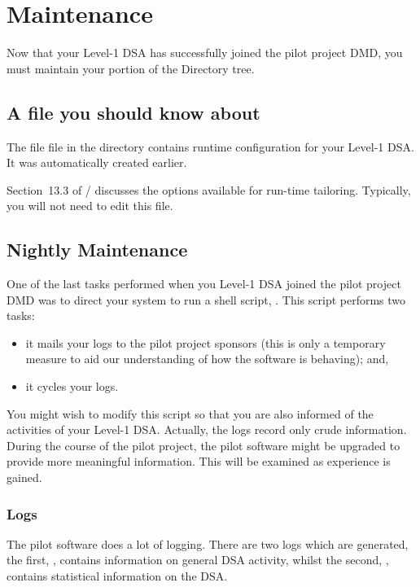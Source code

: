 
\chapter	{Maintenance}
Now that your Level-1 DSA has successfully joined the pilot project DMD,
you must maintain your portion of the Directory tree.

\section	{A file you should know about}
The file  file in the  directory
contains runtime configuration for your Level-1 DSA.
It was automatically created earlier.

Section~13.3 of \volfive/ discusses the options available for run-time
tailoring.
Typically,
you will not need to edit this file.

\section	{Nightly Maintenance}
One of the last tasks performed when you Level-1 DSA joined the pilot project
DMD was to direct your system to run a shell script, .
This script performs two tasks:
\begin{itemize}
\item	it mails your logs to the pilot project sponsors
	(this is only a temporary measure to aid our understanding of
	how the software is behaving);
	and,

\item	it cycles your logs.
\end{itemize}
You might wish to modify this script so that you are also informed of the
activities of your Level-1 DSA.
Actually, the logs record only crude information.
During the course of the pilot project,
the pilot software might be upgraded to provide more meaningful information.
This will be examined as experience is gained.

\subsection	{Logs}
The pilot software does a lot of logging.
There are two logs which are generated,
the first,
,
contains information on general DSA activity,
whilst the second,
,
contains statistical information on the DSA.

